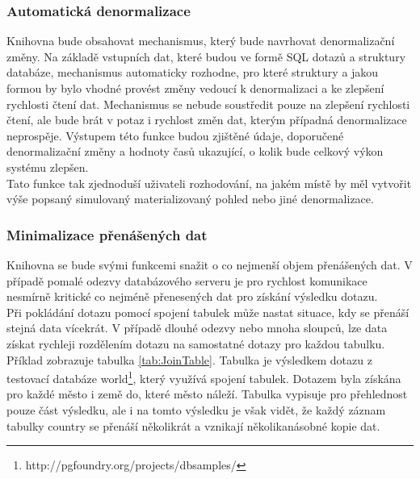 \documentclass[ing,male,java,dept456]{diploma}						%
\begin{document}
\subsubsection{Automatická denormalizace}

Knihovna bude obsahovat mechanismus, který bude navrhovat denormalizační změny. Na základě vstupních dat, které budou ve formě SQL dotazů a struktury databáze, mechanismus automaticky rozhodne, pro které struktury a jakou formou by bylo vhodné provést změny vedoucí k denormalizaci a ke zlepšení rychlosti čtení dat. Mechanismus se nebude soustředit pouze na zlepšení rychlosti čtení, ale bude brát v potaz i rychlost změn dat, kterým případná denormalizace neprospěje. Výstupem této funkce budou zjištěné údaje, doporučené denormalizační změny a hodnoty časů ukazující, o kolik bude celkový výkon systému zlepšen. \\
Tato funkce tak zjednoduší uživateli rozhodování, na jakém místě by měl vytvořit výše popsaný simulovaný materializovaný pohled nebo jiné denormalizace.

\subsubsection{Minimalizace přenášených dat}
\label{subsubsec:Selectin}

Knihovna se bude svými funkcemi snažit o co nejmenší objem přenášených dat. V případě pomalé odezvy databázového serveru je pro rychlost komunikace nesmírně kritické co nejméně přenesených dat pro získání výsledku dotazu. \\
Při pokládání dotazu pomocí spojení tabulek může nastat situace, kdy se přenáší stejná data vícekrát. V případě dlouhé odezvy nebo mnoha sloupců, lze data získat rychleji rozdělením dotazu na samostatné dotazy pro každou tabulku. Příklad zobrazuje tabulka \ref{tab:JoinTable}. Tabulka je výsledkem dotazu z testovací databáze world\footnote{http://pgfoundry.org/projects/dbsamples/}, který využívá spojení tabulek. Dotazem byla získána pro každé město i země do, které město náleží. Tabulka vypisuje pro přehlednost pouze část výsledku, ale i na tomto výsledku je však vidět, že každý záznam tabulky country se přenáší několikrát a vznikají několikanásobné kopie dat. \\
\end{document}
